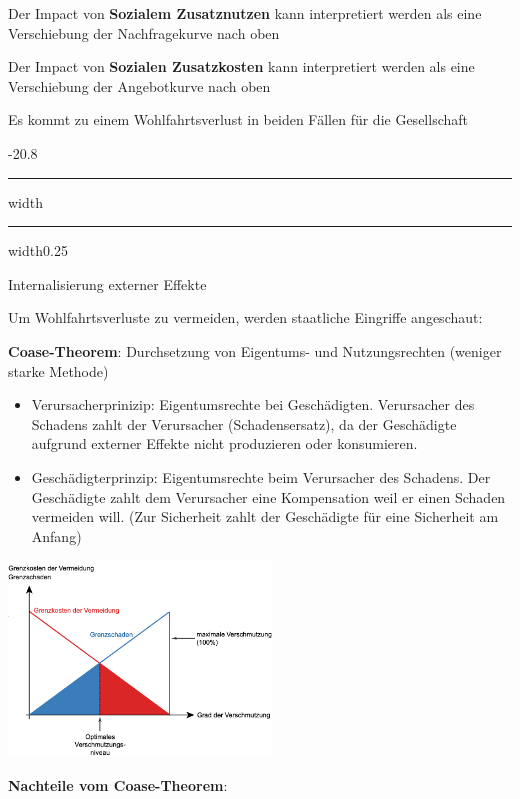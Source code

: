 \documentclass[9pt, landscape, fleqn]{scrartcl}
\makeatletter
\renewcommand{\subsection}{\@startsection{subsection}{1}{0mm}%
{-2\baselineskip}{0.8\baselineskip}%
{\hrule depth 0.2pt width\columnwidth\hrule depth0.75pt
width0.25\columnwidth\vspace*{1.2em}\large\bfseries\rmfamily}}
\makeatother
\begin{document}
\begin{multicols*}{3}
Der Impact von \textbf{Sozialem Zusatznutzen} kann interpretiert werden als eine Verschiebung der Nachfragekurve nach oben \newline 

Der Impact von \textbf{Sozialen Zusatzkosten} kann interpretiert werden als eine Verschiebung der Angebotkurve nach oben  \newline 

Es kommt zu einem Wohlfahrtsverlust in beiden Fällen für die Gesellschaft 

\subsection{Internalisierung externer Effekte}

Um Wohlfahrtsverluste zu vermeiden, werden staatliche Eingriffe angeschaut: \newline

\textbf{Coase-Theorem}: Durchsetzung von Eigentums- und Nutzungsrechten (weniger starke Methode)

\begin{itemize}
    \item Verursacherprinizip: Eigentumsrechte bei Geschädigten. Verursacher des Schadens zahlt der Verursacher (Schadensersatz), da der Geschädigte aufgrund externer Effekte nicht produzieren oder konsumieren.
    \item Geschädigterprinzip: Eigentumsrechte beim Verursacher des Schadens. Der Geschädigte zahlt dem Verursacher eine Kompensation weil er einen Schaden vermeiden will. (Zur Sicherheit zahlt der Geschädigte für eine Sicherheit am Anfang)
\end{itemize}



\begin{center}
    \includegraphics[width=7cm]{Coarse_Modell.png}
\end{center}



\textbf{Nachteile vom Coase-Theorem}:


\end{multicols*}
\end{document}
